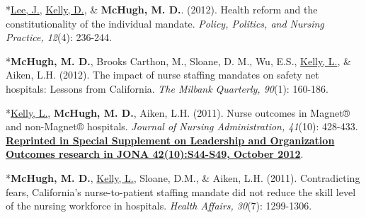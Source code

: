 \documentclass[10pt,]{article}
\begin{document}
{{{{{{{{{{{{{{{\begin{hangparas}{.25in}{1}
\end{hangparas}

\vspace{4mm}

\begin{hangparas}{.25in}{1}

*{\underline {Lee, J.}}, {\underline {Kelly, D.}}, \& {\textbf {McHugh, M. D.}}. (2012). Health reform and the constitutionality of the individual mandate. {\textit {Policy, Politics, and Nursing Practice, 12}}(4): 236-244.

\end{hangparas}

\vspace{4mm}

\begin{hangparas}{.25in}{1}

*{\textbf {McHugh, M. D.}}, Brooks Carthon, M., Sloane, D. M., Wu, E.S., {\underline {Kelly, L.}}, \& Aiken, L.H. (2012). The impact of nurse staffing mandates on safety net hospitals: Lessons from California. {\textit {The Milbank Quarterly, 90}}(1): 160-186.

\end{hangparas}

\vspace{4mm}

\begin{hangparas}{.25in}{1}

*{\underline {Kelly, L.}}, {\textbf {McHugh, M. D.}}, Aiken, L.H. (2011). Nurse outcomes in Magnet® and non-Magnet® hospitals. {\textit {Journal of Nursing Administration, 41}}(10): 428-433. {\textbf {\underline {Reprinted in Special Supplement on Leadership and Organization Outcomes research in JONA 42(10):S44-S49, October 2012}}}.

\end{hangparas}

\vspace{4mm}

\begin{hangparas}{.25in}{1}

*{\textbf {McHugh, M. D.}}, {\underline {Kelly, L.}}, Sloane, D.M., \& Aiken, L.H. (2011). Contradicting fears, California’s nurse-to-patient staffing mandate did not reduce the skill level of the nursing workforce in hospitals. {\textit {Health Affairs, 30}}(7): 1299-1306.

\end{hangparas}

\vspace{4mm}

}}}}}}}}}}}}}}}
\end{document}
